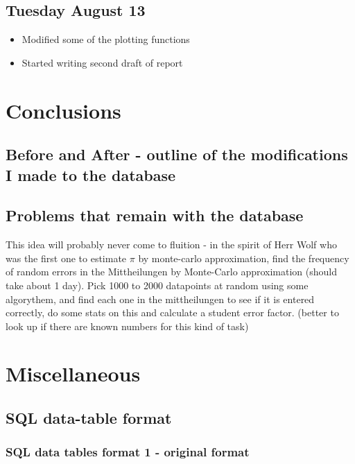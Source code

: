 \documentclass[12pt]{article}
\begin{document}
\subsection{Tuesday August 13}
\begin{itemize}
    \item Modified some of the plotting functions
    \item Started writing second draft of report
\end{itemize}



\section{Conclusions}

\subsection{Before and After - outline of the modifications I made to the database}

\subsection{Problems that remain with the database}

This idea will probably never come to fluition - in the spirit of Herr Wolf who was the first one to estimate $\pi$ by monte-carlo approximation, find the frequency of random errors in the Mittheilungen by Monte-Carlo approximation (should take about 1 day). Pick 1000 to 2000 datapoints at random using some algorythem, and find each one in the mittheilungen to see if it is entered correctly, do some stats on this and calculate a student error factor. (better to look up if there are known numbers for this kind of task)

\section{Miscellaneous}

\subsection{SQL data-table format}

\subsubsection{SQL data tables format 1 - original format}
\end{document}
